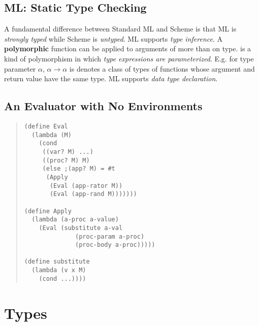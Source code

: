 \documentclass{article}
\begin{document}
\subsection{ML: Static Type Checking}
\bit
\w A fundamental difference between Standard ML and Scheme is that ML is
	{\em{}strongly typed\/} while Scheme is {\em{}untyped\/}.
\w ML supports {\em{}type inference\/}.
\w A {\bf{}polymorphic} function can be applied to arguments of 
	more than on type.
	\bit
	 is a kind of polymorphism
		in which {\em{}type expressions are parameterized}.
		E.g. for type parameter $\alpha$, $\alpha \rightarrow
		\alpha$ is denotes a class of types of functions whose
		argument and return value have the same type.
	\eit
\w ML supports {\em{}data type declaration}.
\eit

\subsection{An Evaluator with No Environments}
\begin{quote}
\begin{verbatim}
(define Eval
  (lambda (M)
    (cond
     ((var? M) ...)
     ((proc? M) M)
     (else ;(app? M) = #t
      (Apply
       (Eval (app-rator M))
       (Eval (app-rand M)))))))

(define Apply 
  (lambda (a-proc a-value)
    (Eval (substitute a-val
		      (proc-param a-proc)
		      (proc-body a-proc)))))

(define substitute
  (lambda (v x M)
    (cond ...))))
\end{verbatim}
\end{quote}


\section{Types}
\end{document}
